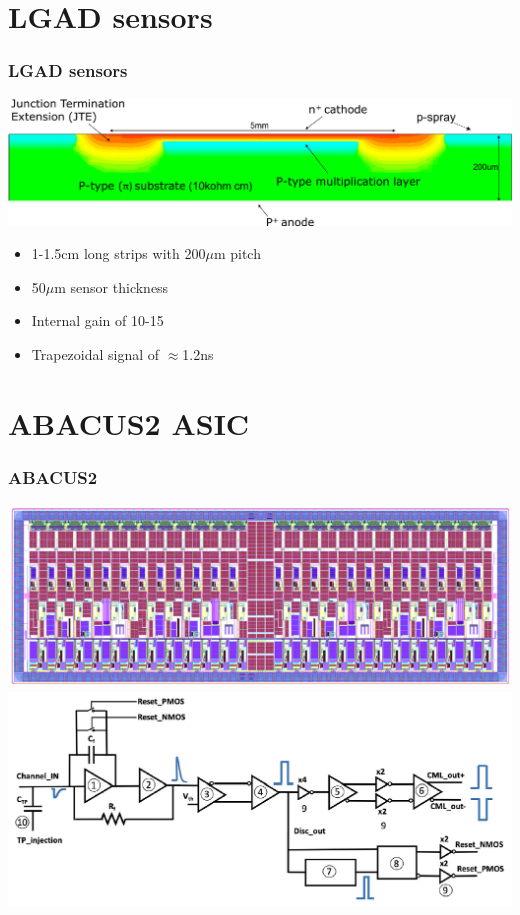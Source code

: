 \documentclass[aspectratio=169]{beamer}
\begin{document}
	\section{LGAD sensors}
	
	\begin{frame}
	\frametitle{LGAD sensors}
		\begin{center}
			\includegraphics[width=0.9 \textwidth]{IMG/LGAD_image.PNG}
		\end{center}
		\begin{itemize}
			\item 1-1.5cm long strips with 200$\mu$m pitch
			\item 50$\mu$m sensor thickness
			\item Internal gain of 10-15 
			\item Trapezoidal signal of $\approx$1.2ns
		\end{itemize}
	\end{frame}

	\section{ABACUS2 ASIC}
	
	\begin{frame}
	\frametitle{ABACUS2}
		\begin{center}
			\includegraphics[width=0.6 \textwidth]{IMG/ABACUS.PNG}
			\includegraphics[width=0.6 \textwidth]{IMG/ABACUS_channel.PNG}
		\end{center}
	\end{frame}
\end{document}
